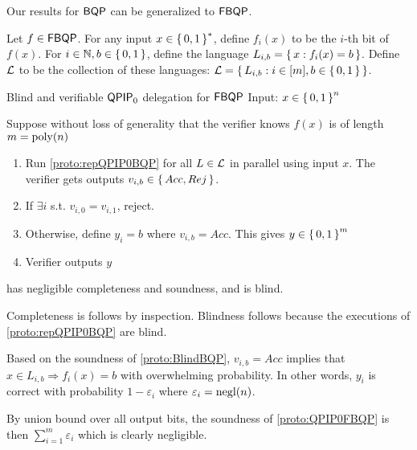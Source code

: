 
Our results for $\operatorname{\mathsf{BQP}}$ can be generalized to $\operatorname{\mathsf{FBQP}}$.

Let $f\in\operatorname{\mathsf{FBQP}}$.
For any input $x\in\set{0, 1}^*$, define $f_i(x)$ to be the $i$-th bit of $f(x)$.
For $i\in\mathbb{N}, b\in\set{0,1}$, define the language $L_{i, b}=\set{x:f_i(x)=b}$.
Define ${\cal L}$ to be the collection of these languages: ${\cal L} = \set{L_{i, b}: i\in[m], b\in\set{0, 1}}$.

\begin{protocol}{Blind and verifiable $\operatorname{\mathsf{QPIP}}_0$ delegation for $\operatorname{\mathsf{FBQP}}$}
	\label{proto:QPIP0FBQP}
	Input: $x\in\set{0, 1}^n$

	Suppose without loss of generality that the verifier knows $f(x)$ is of length $m=\operatorname*{\operatorname{poly}}(n)$ 
	\begin{enumerate}
		\item Run \cref{proto:repQPIP0BQP} for all $L\in{\cal L}$ in parallel using input $x$. The verifier gets outputs $v_{i, b}\in\set{Acc, Rej}$.
		\item If $\exists i$ s.t. $v_{i,0}=v_{i,1}$, reject.
		\item Otherwise, define $y_i = b$ where $v_{i, b}=Acc$. This gives $y\in\set{0,1}^m$
		\item Verifier outputs $y$
	\end{enumerate}
\end{protocol}

\begin{theorem}
	 has negligible completeness and soundness, and is blind.
\end{theorem}
\begin{prf}
	Completeness is follows by inspection.
	Blindness follows because the executions of \cref{proto:repQPIP0BQP} are blind.

	Based on the soundness of \cref{proto:BlindBQP}, $v_{i, b}=Acc$ implies that $x\in L_{i, b}\Rightarrow f_i(x)=b$ with overwhelming probability.
	In other words, $y_i$ is correct with probability $1-\varepsilon_i$ where $\varepsilon_i=\operatorname{negl}(n)$. 
	
	By union bound over all output bits, the soundness of \cref{proto:QPIP0FBQP} is then
	$\sum_{i=1}^m \varepsilon_i$
	which is clearly negligible.
\end{prf}
